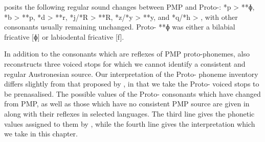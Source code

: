 \citet{Nivens1993,Nivens2017} posits the following regular sound changes
between PMP and Proto-: *p > **ɸ,
*b > **p, *d > **r,
*j/*R > **R, *z/*y > **y,
and *q/*h > {\0}, with other consonants usually remaining unchanged.
Proto- **ɸ was either a bilabial fricative [ɸ] or labiodental fricative [f].

In addition to the consonants which are reflexes of PMP proto-phonemes,
\citet{Nivens2017} also reconstructs three voiced stops for which
we cannot identify a consistent
and regular Austronesian source.
Our interpretation of the Proto- phoneme inventory differs
slightly from that proposed by \citet{Nivens1993,Nivens2017}, in that we take the Proto- voiced stops to be prenasalised.
The possible values of the Proto- consonants which have changed
from PMP, as well as those which have no consistent PMP source are given
in  along with their reflexes in selected languages.
The third line gives the phonetic values assigned to them by
\citet{Nivens1993,Nivens2017}, while the fourth line gives the interpretation which we
take in this chapter.

